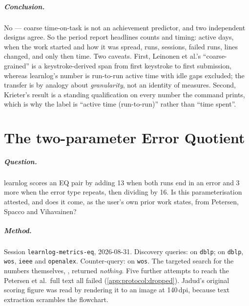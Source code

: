 \paragraph{Conclusion.}
No --- coarse time-on-task is not an achievement predictor, and two
independent designs agree.  So the period report headlines counts and
timing: active days, when the work started and how it was spread, runs,
sessions, failed runs, lines changed, and only then time.  Two caveats.
First, Leinonen et al.'s \enquote{coarse-grained} is a keystroke-derived
span from first keystroke to first submission, whereas learnlog's number is
run-to-run active time with idle gaps excluded; the transfer is by analogy
about \emph{granularity}, not an identity of measures.  Second, Krieter's
result is a standing qualification on every number the command prints, which
is why the label is \enquote{active time (run-to-run)} rather than
\enquote{time spent}.

\chapter{The two-parameter Error Quotient}
\label{app:claim:eq-parameters}

\paragraph{Question.}
learnlog scores an EQ pair by adding 13 when both runs end in an error and 3
more when the error type repeats, then dividing by 16.  Is this
parameterisation attested, and does it come, as the user's own prior work
states, from Petersen, Spacco and Vihavainen?

\paragraph{Method.}
Session \texttt{learnlog-metrics-eq}, 2026-08-31.  Discovery queries:
 on \texttt{dblp};  on \texttt{dblp}, \texttt{wos}, \texttt{ieee} and
\texttt{openalex}.  Counter-query:  on \texttt{wos}.  The
targeted search for the numbers themselves,
, returned \emph{nothing}.  Five further
attempts to reach the Petersen et al.\ full text all failed
(\cref{app:protocol:dropped}).  Jadud's original scoring figure was read by
rendering it to an image at 140\,dpi, because text extraction scrambles the
flowchart.


